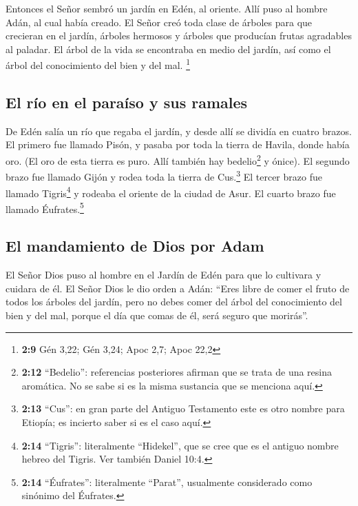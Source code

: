  Entonces el Señor sembró un jardín en Edén, al oriente.
Allí puso al hombre Adán, al cual había creado.  El Señor
creó toda clase de árboles para que crecieran en el jardín, árboles
hermosos y árboles que producían frutas agradables al paladar. El árbol
de la vida se encontraba en medio del jardín, así como el árbol del
conocimiento del bien y del mal. \footnote{\textbf{2:9} Gén 3,22; Gén
  3,24; Apoc 2,7; Apoc 22,2}

\hypertarget{el-ruxedo-en-el-parauxedso-y-sus-ramales}{%
\subsection{El río en el paraíso y sus
ramales}\label{el-ruxedo-en-el-parauxedso-y-sus-ramales}}

 De Edén salía un río que regaba el jardín, y desde allí
se dividía en cuatro brazos.  El primero fue llamado
Pisón, y pasaba por toda la tierra de Havila, donde había oro.
 (El oro de esta tierra es puro. Allí también hay
bedelio\footnote{\textbf{2:12} ``Bedelio'': referencias posteriores
  afirman que se trata de una resina aromática. No se sabe si es la
  misma sustancia que se menciona aquí.} y ónice).  El
segundo brazo fue llamado Gijón y rodea toda la tierra de
Cus.\footnote{\textbf{2:13} ``Cus'': en gran parte del Antiguo
  Testamento este es otro nombre para Etiopía; es incierto saber si es
  el caso aquí.}  El tercer brazo fue llamado
Tigris\footnote{\textbf{2:14} ``Tigris'': literalmente ``Hidekel'', que
  se cree que es el antiguo nombre hebreo del Tigris. Ver también Daniel
  10:4.} y rodeaba el oriente de la ciudad de Asur. El cuarto brazo fue
llamado Éufrates.\footnote{\textbf{2:14} ``Éufrates'': literalmente
  ``Parat'', usualmente considerado como sinónimo del Éufrates.}

\hypertarget{el-mandamiento-de-dios-por-adam}{%
\subsection{El mandamiento de Dios por
Adam}\label{el-mandamiento-de-dios-por-adam}}

 El Señor Dios puso al hombre en el Jardín de Edén para
que lo cultivara y cuidara de él.  El Señor Dios le dio
orden a Adán: ``Eres libre de comer el fruto de todos los árboles del
jardín,  pero no debes comer del árbol del conocimiento
del bien y del mal, porque el día que comas de él, será seguro que
morirás''.

